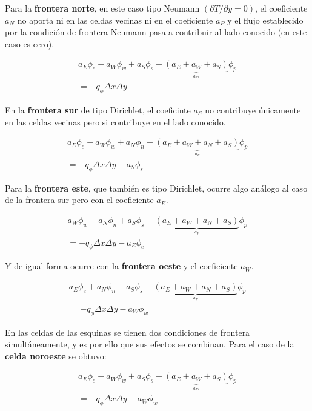 \documentclass[article,latterpaper]{IEEEtran}
\begin{document}
Para la \textbf{frontera norte}, en este caso tipo Neumann $(\partial T/\partial y=0)$, el coeficiente $a_N$ no aporta ni en las celdas vecinas ni en el coeficiente $a_P$ y el flujo establecido por la condición de frontera Neumann pasa a contribuir al lado conocido (en este caso es cero).

\begin{multline}
    a_E\phi_e + a_W\phi_w + a_S\phi_s - \underbrace{(a_E+a_W+a_S)}_{\overset{a_{P1}}{}} \phi_p \\ 
    = -q_{\phi} \Delta x \Delta y 
    \label{dis_N}
\end{multline}

En la \textbf{frontera sur} de tipo Dirichlet, el coeficinte $a_S$ no contribuye únicamente en las celdas vecinas pero si contribuye en el lado conocido.

\begin{multline}
    a_E\phi_e + a_W\phi_w + a_N\phi_n - \underbrace{(a_E+a_W+a_N+a_S)}_{\overset{a_{P}}{}} \phi_p \\ 
    = -q_{\phi} \Delta x \Delta y - a_S \phi_s 
    \label{dis_S}
\end{multline}

Para la \textbf{frontera este}, que también es tipo Dirichlet, ocurre algo análogo al caso de la frontera sur pero con el coeficiente $a_E$.

\begin{multline}
    a_W\phi_w + a_N\phi_n + a_S\phi_s - \underbrace{(a_E+a_W+a_N+a_S)}_{\overset{a_{P}}{}} \phi_p \\
    = -q_{\phi} \Delta x \Delta y - a_E \phi_e 
    \label{dis_E}
\end{multline}

Y de igual forma ocurre con la \textbf{frontera oeste} y el coeficiente $a_W$.

\begin{multline}
    a_E\phi_e + a_N\phi_n + a_S\phi_s - \underbrace{(a_E+a_W+a_N+a_S)}_{\overset{a_{P}}{}} \phi_p \\
    = -q_{\phi} \Delta x \Delta y - a_W\phi_w 
    \label{dis_W}
\end{multline}

En las celdas de las esquinas se tienen dos condiciones de frontera simultáneamente, y es por ello que sus efectos se combinan. Para el caso de la \textbf{celda noroeste} se obtuvo:

\begin{multline}
    a_E\phi_e + a_W\phi_w + a_S\phi_s - \underbrace{(a_E+a_W+a_S)}_{\overset{a_{P1}}{}} \phi_p \\
    = -q_{\phi} \Delta x \Delta y - a_W\phi_w
    \label{dis_NW}
\end{multline}
\end{document}
